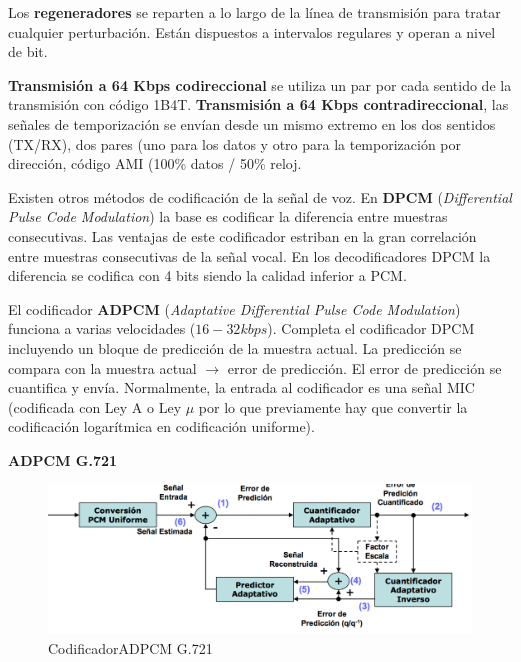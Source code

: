 \documentclass[10pt,portrait, twocolumn]{article}
\makeatletter
\renewcommand{\subsubsection}{\@startsection{subsubsection}{3}{0mm}%
                                {-1ex plus -.5ex minus -.2ex}%
                                {1ex plus .2ex}%
                                {\normalfont\small\bfseries}}
\makeatother
\begin{document}
Los \textbf{regeneradores} se reparten a lo largo de la línea de transmisión para tratar cualquier perturbación. Están dispuestos a intervalos regulares y operan a nivel de bit.


\textbf{Transmisión a 64 Kbps codireccional} se utiliza un par por cada sentido de la transmisión con código 1B4T. \textbf{Transmisión a 64 Kbps contradireccional}, las señales de temporización se envían desde un mismo extremo en los dos sentidos (TX/RX), dos pares (uno para los datos y otro para la temporización por dirección, código AMI (100\% datos / 50\% reloj.


Existen otros métodos de codificación de la señal de voz. En \textbf{DPCM} (\textit{Differential Pulse Code Modulation}) la base es codificar la diferencia entre muestras consecutivas. Las ventajas de este codificador estriban en la gran correlación entre muestras consecutivas de la señal vocal. En los decodificadores DPCM la diferencia se codifica con 4 bits siendo la calidad inferior a PCM. 

El codificador \textbf{ADPCM} (\textit{Adaptative Differential Pulse Code Modulation}) funciona a varias velocidades ($16-32 kbps$). Completa el codificador DPCM incluyendo un bloque de predicción de la muestra actual. La predicción se compara con la muestra actual $\rightarrow$ error de predicción. El error de predicción se cuantifica y envía. Normalmente, la entrada al codificador es una señal MIC (codificada con Ley A o Ley $\mu$ por lo que previamente hay que convertir la codificación logarítmica en codificación uniforme).

\textbf{ADPCM G.721}
	
	
	\begin{figure}[!ht]
 		\centering
  		 \includegraphics[scale = 0.4]{images/ADPCM1}
		\caption{CodificadorADPCM G.721}
	\end{figure}	
	
\end{document}
